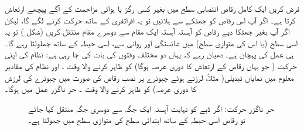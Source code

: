 

 
فرض کریں ایک کامل رقاص انتصابی سطح میں بغیر کسی رگڑ یا ہوائی مزاحمت کے آگے پیچھے ارتعاش کرتا ہے۔ اگر آپ اس رقاص کو جھٹکے سے ہلائیں تو یہ افراتفری کے ساتھ حرکت کرنے لگے گا، لیکن اگر آپ بغیر جھٹکا دیے رقاص کو آہستہ آہستہ ایک مقام سے دوسرے مقام منتقل کریں (شکل ) تو یہ اسی سطح (یا اس کی متوازی سطح) میں شائستگی اور روانی سے، اسی حیطہ کے ساتھ جھلولتا رہے گا۔ ہی  عمل کی پہچان ہے۔ دھیان رہے کہ یہاں دو مختلف وقتوں کی بات کی جا رہی ہے: نظام کی اپنی حرکت ( جو یہاں رقاص کے ارتعاش کا دوری عرصہ ہوگا) کو ظاہر کرنے والا وقت ، اور نظام کی مقادیر معلوم میں نمایاں تبدیلی( مثلاً، لرزتے ہوئے چبوترے پر نصب رقاص کی صورت میں چبوترے کی لرزش کا دوری عرصہ) کو ظاہر کرنے والا  وقت ۔ حر ناگزر عمل میں  ہوگا۔

\begin{figure}
\centering
{}
\caption{حر ناگزر حرکت: اگر ڈبے کو نہایت آہستہ ایک جگہ سے دوسری جگہ منتقل کیا جائے تو رقاص اسی حیطہ کے ساتھ ابتدائی سطح کی متوازی سطح میں جھولتا ہے۔}
\label{شکل_حرارت_نا_گزر_آہستہ_منتقلی}
\end{figure}


